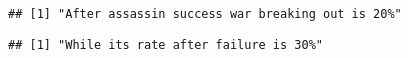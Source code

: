 \documentclass[
]{article}
\newenvironment{Shaded}{\begin{snugshade}}{\end{snugshade}}
\newcommand{\NormalTok}[1]{#1}
\newcommand{\StringTok}[1]{\textcolor[rgb]{0.31,0.60,0.02}{#1}}
\begin{document}
\begin{Shaded}
\end{Shaded}

\begin{verbatim}
## [1] "After assassin success war breaking out is 20%"
\end{verbatim}

\begin{Shaded}
\end{Shaded}

\begin{verbatim}
## [1] "While its rate after failure is 30%"
\end{verbatim}
\end{document}
